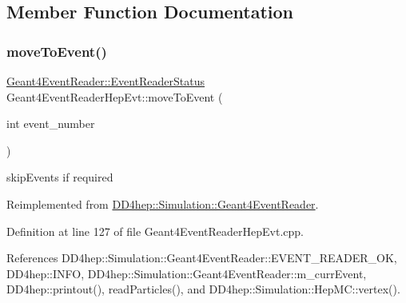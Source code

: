 \subsection{Member Function Documentation}
\hypertarget{class_d_d4hep_1_1_simulation_1_1_geant4_event_reader_hep_evt_a9e8bf8ad3882ab62d481c6020b9adaed}{}\label{class_d_d4hep_1_1_simulation_1_1_geant4_event_reader_hep_evt_a9e8bf8ad3882ab62d481c6020b9adaed} 
\subsubsection{\texorpdfstring{move\+To\+Event()}{moveToEvent()}}
{\footnotesize\ttfamily \hyperlink{class_d_d4hep_1_1_simulation_1_1_geant4_event_reader_ae4f4bc83ffcf5b0c1868ad78859851e7}{Geant4\+Event\+Reader\+::\+Event\+Reader\+Status} Geant4\+Event\+Reader\+Hep\+Evt\+::move\+To\+Event (\begin{DoxyParamCaption}\item[{int}]{event\+\_\+number }\end{DoxyParamCaption})\hspace{0.3cm}{\ttfamily [virtual]}}



skip\+Events if required 



Reimplemented from \hyperlink{class_d_d4hep_1_1_simulation_1_1_geant4_event_reader_a0b6d2fe12ae259534cbe7a5b6e35b642}{D\+D4hep\+::\+Simulation\+::\+Geant4\+Event\+Reader}.



Definition at line 127 of file Geant4\+Event\+Reader\+Hep\+Evt.\+cpp.



References D\+D4hep\+::\+Simulation\+::\+Geant4\+Event\+Reader\+::\+E\+V\+E\+N\+T\+\_\+\+R\+E\+A\+D\+E\+R\+\_\+\+OK, D\+D4hep\+::\+I\+N\+FO, D\+D4hep\+::\+Simulation\+::\+Geant4\+Event\+Reader\+::m\+\_\+curr\+Event, D\+D4hep\+::printout(), read\+Particles(), and D\+D4hep\+::\+Simulation\+::\+Hep\+M\+C\+::vertex().

\hypertarget{class_d_d4hep_1_1_simulation_1_1_geant4_event_reader_hep_evt_a936bde758e79dbb3c1e053a27261ad3b}{}\label{class_d_d4hep_1_1_simulation_1_1_geant4_event_reader_hep_evt_a936bde758e79dbb3c1e053a27261ad3b} 
